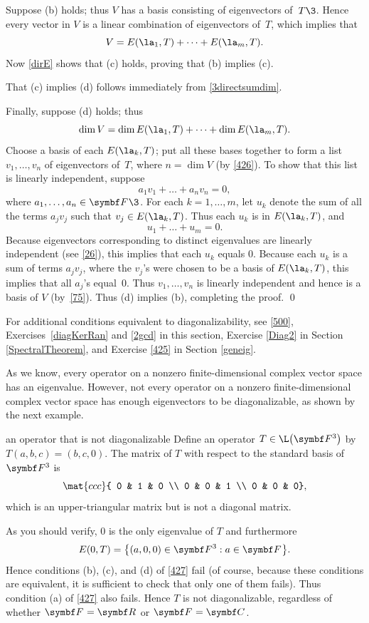 Suppose (b) holds; thus $V$ has a basis consisting of
eigenvectors of~$T\3$.  Hence every vector in $V$ is a linear combination
of eigenvectors of~$T$, which implies that
\[
V = E(\la_1, T) + \dots + E(\la_m, T).
\]
Now \ref{dirE} shows that (c) holds, proving that (b) implies (c).

That (c) implies (d) follows immediately from \ref{3directsumdim}.

Finally, suppose (d) holds; thus
\begin{equation} \label{426}
\dim V = \dim E(\la_1, T) + \dots + \dim E(\la_m, T).
\end{equation}%
Choose a basis of each $E(\la_k, T)$; put all these
bases together to form a list $v_1, \dots, v_n$ of eigenvectors
of~$T$, where $n = \dim V$ (by \ref{426}).  To show that this list is
linearly independent, suppose
\[
a_1 v_1 + \dots + a_n v_n = 0,
\]
where $a_1, \dots, a_n \in \F{}\3$.  For each $k = 1, \dots, m$, let
$u_k$ denote the sum of all the terms $a_j v_j$ such that
$v_j \in E(\la_k, T)$.  Thus each $u_k$ is in $E(\la_k, T)$, and
\[
u_1 + \dots + u_m = 0.
\]
Because eigenvectors corresponding to distinct eigenvalues are linearly
independent (see \ref{26}), this implies that each $u_k$ equals
$0$.  Because each $u_k$ is a sum of terms $a_j v_j$, where the
$v_j$'s were chosen to be a basis of $E(\la_k, T)$, this implies
that all $a_j$'s equal~$0$.  Thus $v_1, \dots, v_n$ is linearly
independent and hence is a basis of $V$ (by~\ref{75}).  Thus (d)
implies (b), completing the proof.
\qed

For additional conditions equivalent to diagonalizability, see \ref{500}, Exercises~\ref{diagKerRan} and \ref{2gcd} in this section, Exercise \ref{Diag2} in Section \ref{SpectralTheorem}, and Exercise \ref{425} in Section \ref{geneig}.

\pagebreak[3]

As we know, every operator on a nonzero finite-dimensional complex \mbox{vector} space has an eigenvalue. However, not every operator on a nonzero finite-dimensional complex vector space has enough eigenvectors to be diagonalizable, as shown by the next example.

\begin{example}[428]{an operator that is not diagonalizable}
Define an operator $T \in \L\paren[\big]{\F{3}}$ by
$
T(a,b,c) = (b,c, 0)$. The matrix of $T$ with respect to the standard basis of $\F3$ is
\[
\mat{ccc}{
0 & 1 & 0 \\
0 & 0 & 1 \\
0 & 0 & 0},
\]
which is an upper-triangular matrix but is not a diagonal matrix.

As you should verify, $0$ is the only eigenvalue of $T$ and furthermore
\[
E(0, T) = \br[\big]{(a,0,0) \in \F3: a \in \F{}}.
\]
Hence conditions (b), (c), and (d) of \ref{427} fail (of course, because these conditions are equivalent, it is sufficient to check that only one of them fails). Thus condition (a) of \ref{427} also fails. Hence $T$ is not diagonalizable, regardless of  whether
$\F{} = \R{}$ or $\F{} =\C{}$.
\end{example}


